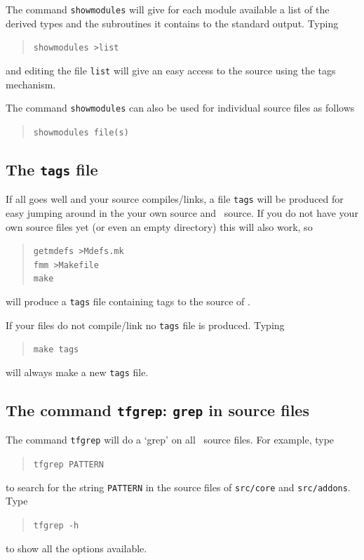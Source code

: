 The command \texttt{showmodules} will give for each module available a list of
the derived types and the subroutines it contains to the standard output.
Typing
\begin{quote}
       \texttt{showmodules >list}
\end{quote}
and editing the file \texttt{list} will give an easy access to the source using
the tags mechanism.

The command \texttt{showmodules} can also be used for individual source files
as follows
\begin{quote}
       \texttt{showmodules file(s)}
\end{quote}

\subsection{The \texttt{tags} file}

If all goes well and your source compiles/links, a file \texttt{tags} will be
produced for easy jumping around in the your own source and \tfem\ source. If
you do not have your own source files yet (or even an empty directory)
this will also work, so
\begin{quote}
   \texttt{getmdefs >Mdefs.mk}\\
   \texttt{fmm >Makefile}\\
   \texttt{make}
\end{quote}
will produce a \texttt{tags} file containing tags to the source of \tfem.

If your files do not compile/link no \texttt{tags} file is produced. Typing
\begin{quote}
   \texttt{make tags}
\end{quote}
will always make a new \texttt{tags} file.

\subsection{The command \texttt{tfgrep}: \texttt{grep} in source files}

The command \texttt{tfgrep} will do a `grep' on all \tfem\ source files. For example, type
\begin{quote}
   \texttt{tfgrep PATTERN}
\end{quote}
to search for the string \texttt{PATTERN} in the source files of
\texttt{src/core} and \texttt{src/addons}. Type
\begin{quote}
   \texttt{tfgrep -h}
\end{quote}
to show all the options available.

